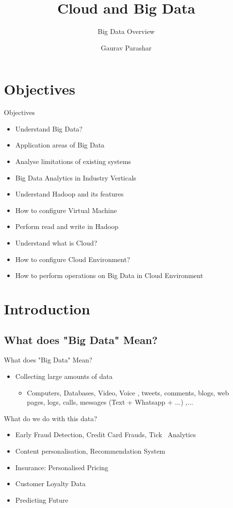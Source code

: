 \documentclass[pdf]{beamer}
\title{Cloud and Big Data}
\subtitle{Big Data Overview}
\author{Gaurav Parashar}
\begin{document}
\begin{frame}
	\thispagestyle{empty}
	\titlepage
\end{frame}
\tableofcontents

\section{Objectives}
\begin{frame}{Objectives}
	\begin{itemize}
		\item Understand Big Data? \pause
		\item Application areas of Big Data \pause
		\item Analyse limitations of existing systems \pause
		\item Big Data Analytics in Industry Verticals \pause
		\item Understand Hadoop and its features \pause
		\item How to configure Virtual Machine \pause
		\item Perform read and write in Hadoop \pause
		\item Understand what is Cloud?\pause
		\item How to configure Cloud Environment? \pause
		\item How to perform operations on Big Data in Cloud Environment
	\end{itemize}
\end{frame}


\section{Introduction}

\subsection{What does "Big Data" Mean?}

\begin{frame}{What does "Big Data" Mean?}
	\begin{itemize}
		\pause
		\item Collecting large amounts of data
		\pause
		\begin{itemize}
			\item Computers, Databases, Video, Voice , tweets, comments, blogs, web pages, logs, calls, messages (Text + Whatsapp + ...) ,...
		\end{itemize}
	\end{itemize}
\pause
 What do we do with this data?	
\begin{itemize}
		\pause
		\item Early Fraud Detection, Credit Card Frauds, Tick~\cite{tic} Analytics 
		\pause
		\item Content personalisation, Recommendation System  
		\pause
		\item Insurance: Personalised Pricing
		\pause
		\item Customer Loyalty Data
		\pause
		\item Predicting Future
	\end{itemize}
\end{frame}
\end{document}
